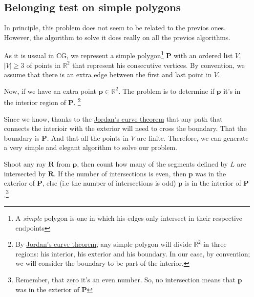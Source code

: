 {\centering
\begin{minipage}{\linewidth}
\end{minipage}
\par
}

\subsection{Belonging test on simple polygons}
\label{sec:belongTest}

In principle, this problem does not seem to be related to the previos ones.
However, the algorithm to solve it does really on all the previos algorithms.

As it is ussual in CG, we represent a simple polygon\footnote{A \emph{simple} polygon is one in which his edges only intersect in their respective endpoints} $\mathbf{P}$ with an ordered list $V$, $|V| \geq 3$ of points in $\mathbb{R}^2$ that represent his consecutive vertices.
By convention, we assume that there is an extra edge between the first and last point in $V$.

Now, if we have an extra point $\mathbf{p} \in \mathbb{R}^2$.
The problem is to determine if $\mathbf{p}$ it's in the interior region of $\mathbf{P}$.
\footnote{By \href{https://en.wikipedia.org/wiki/Jordan_curve_theorem}{Jordan's curve theorem}, any simple polygon will divide $\mathbb{R}^2$ in three regions: his interior, his exterior and his boundary. In our case, by convention; we will consider the boundary to be part of the interior.}

Since we know, thanks to the \href{https://en.wikipedia.org/wiki/Jordan_curve_theorem}{Jordan's curve theorem} that any path that connects the interioir with the exterior will need to cross the boundary.
That the boundary is $\mathbf{P}$.
And that all the points in $V$ are finite. 
Therefore, we can generate a very simple and elegant algorithm to solve our problem.

Shoot any ray $\mathbf{R}$ from $\mathbf{p}$, then count how many of the segments defined by $L$ are intersected by $\mathbf{R}$. 
If the number of intersections is even, then $\mathbf{p}$ was in the exterior of $\mathbf{P}$, else (i.e the number of intersections is odd) $\mathbf{p}$ is in the interior of $\mathbf{P}$.\footnote{Remember, that zero it's an even number. So, no intersection means that $\mathbf{p}$ was in the exterior of $\mathbf{P}$}

